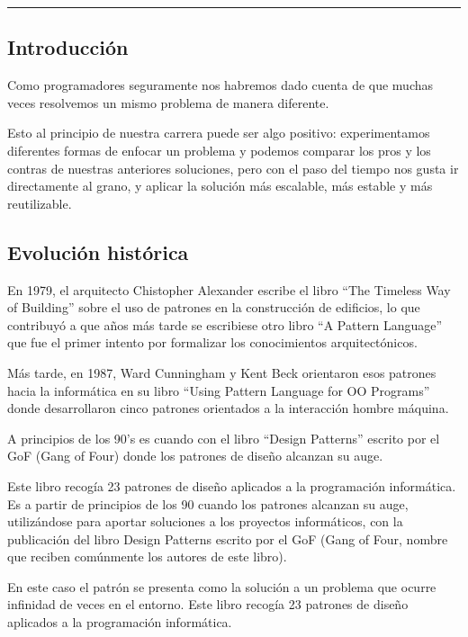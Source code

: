 \documentclass{article}
\begin{document}
\begin{center}\rule{1\textwidth}{0.05mm} \end{center}


\begin{multicols}{2}
\section{Introducción}
 
 \quad  Como programadores seguramente nos habremos dado cuenta de que muchas veces resolvemos un mismo problema de manera diferente.
 
 Esto al principio de nuestra carrera puede ser algo positivo: experimentamos diferentes formas de enfocar un problema y podemos comparar los pros y los contras de nuestras anteriores soluciones, pero con el paso del tiempo nos gusta ir directamente al grano, y aplicar la solución más escalable, más estable y más reutilizable.
 
 \subsection{Evolución histórica} 
 
 \quad  En 1979, el arquitecto Chistopher Alexander escribe el libro “The Timeless Way of Building” sobre el uso de patrones en la construcción de edificios, lo que contribuyó a que años más tarde se escribiese otro libro “A Pattern Language” que fue el primer intento por formalizar los conocimientos arquitectónicos.
 
 Más tarde, en 1987, Ward Cunningham y Kent Beck orientaron esos patrones hacia la informática en su libro “Using Pattern Language for OO Programs” donde desarrollaron cinco patrones orientados a la interacción hombre máquina.
 
 A principios de los 90’s es cuando con el libro “Design Patterns” escrito por el GoF (Gang of Four) donde los patrones de diseño alcanzan su auge.
 
 Este libro recogía 23 patrones de diseño aplicados a la programación informática. Es a partir de principios de los 90 cuando los patrones alcanzan su auge, utilizándose para aportar soluciones a los proyectos informáticos, con la publicación del libro Design Patterns escrito por el GoF (Gang of Four, nombre que reciben comúnmente los autores de este libro). 
 
 En este caso el patrón se presenta como la solución a un problema que ocurre infinidad de veces en el entorno. Este libro recogía 23 patrones de diseño aplicados a la programación informática.
 

\end{multicols}
\end{document}
